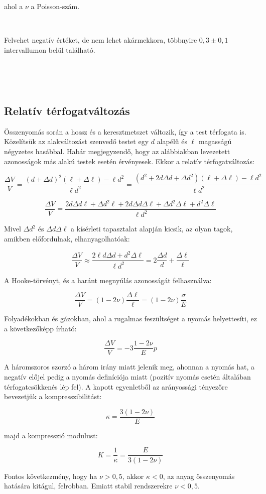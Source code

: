 \documentclass[a4paper, 12pt]{article}
\begin{document}
ahol a $\nu$ a Poisson-szám.

~

Felvehet negatív értéket, de nem lehet akármekkora, többnyire $0,3\pm 0,1$ intervallumon belül található.

~

~

\subsection*{Relatív térfogatváltozás}


Összenyomás során a hossz és a keresztmetszet változik, így a test térfogata is. Közelítsük az alakváltozást szenvedő testet egy $d$ alapélű és $\ell$ magasságú négyzetes hasábbal. Habár megjegyzendő, hogy az alábbiakban levezetett azonosságok más alakú testek esetén érvényesek. Ekkor a relatív térfogatváltozás:

$$\frac{\Delta V}{V}=\frac{(d+\Delta d)^2(\ell+\Delta\ell)-\ell d^2}{\ell d^2}=\frac{(d^2+2d\Delta d+\Delta d^2)(\ell+\Delta\ell)-\ell d^2}{\ell d^2}$$

$$\frac{\Delta V}{V}=\frac{2d\Delta d\ell+\Delta d^2\ell+2d\Delta d\Delta\ell+\Delta d^2\Delta\ell+d^2\Delta\ell}{\ell d^2}$$

Mivel $\Delta d^2$ és $\Delta d\Delta\ell$ a kísérleti tapasztalat alapján kicsik, az olyan tagok, amikben előfordulnak, elhanyagolhatóak:

$$\frac{\Delta V}{V}\approx \frac{2\ell d\Delta d+d^2\Delta\ell}{\ell d^2}=2\frac{\Delta d}{d}+\frac{\Delta\ell}{\ell}$$

A Hooke-törvényt, és a haránt megnyúlás azonosságát felhasználva:

$$\frac{\Delta V}{V}=(1-2\nu)\frac{\Delta\ell}{\ell}=(1-2\nu)\frac{\sigma}{E}$$

Folyadékokban és gázokban, ahol a rugalmas feszültséget a nyomás helyettesíti, ez a következőképp írható:

$$\frac{\Delta V}{V}=-3\frac{1-2\nu}{E}p$$

A háromszoros szorzó a három irány miatt jelenik meg, ahonnan a nyomás hat, a negatív előjel pedig a nyomás definíciója miatt (pozitív nyomás esetén általában térfogatcsökkenés lép fel). A kapott egyenletből az arányossági tényezőre bevezetjük a kompresszibilitást:

$$\kappa=\frac{3(1-2\nu)}{E}$$

majd a kompresszió modulust: 

$$K=\frac{1}{\kappa}=\frac{E}{3(1-2\nu)}$$

Fontos következmény, hogy ha $\nu>0,5$, akkor $\kappa<0$, az anyag összenyomás hatására kitágul, felrobban. Emiatt stabil rendszerekre $\nu<0,5$.
\end{document}
